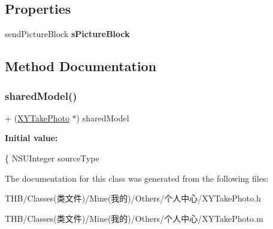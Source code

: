 \subsection*{Properties}
\begin{DoxyCompactItemize}
\item 
\mbox{\label{interface_x_y_take_photo_a62bbd6b691322fcc3f6a180eb9164917}} 
send\+Picture\+Block {\bfseries s\+Picture\+Block}
\end{DoxyCompactItemize}


\subsection{Method Documentation}
\mbox{\label{interface_x_y_take_photo_a567ae3b8a36dd5c9a972ee0b83e00f38}} 
\subsubsection{\texorpdfstring{shared\+Model()}{sharedModel()}}
{\footnotesize\ttfamily + (\mbox{\hyperlink{interface_x_y_take_photo}{X\+Y\+Take\+Photo}} $\ast$) shared\+Model \begin{DoxyParamCaption}{ }\end{DoxyParamCaption}}

{\bfseries Initial value\+:}
\begin{DoxyCode}
\{
    NSUInteger sourceType
\end{DoxyCode}


The documentation for this class was generated from the following files\+:\begin{DoxyCompactItemize}
\item 
T\+H\+B/\+Classes(类文件)/\+Mine(我的)/\+Others/个人中心/X\+Y\+Take\+Photo.\+h\item 
T\+H\+B/\+Classes(类文件)/\+Mine(我的)/\+Others/个人中心/X\+Y\+Take\+Photo.\+m\end{DoxyCompactItemize}
